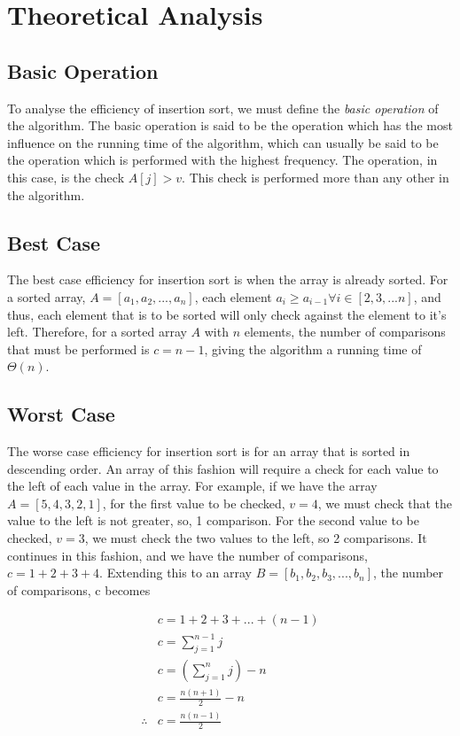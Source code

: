 \documentclass{article}
\begin{document}
\section{Theoretical Analysis}
    \subsection{Basic Operation}
        To analyse the efficiency of insertion sort, we must define the \textit{basic operation} of the algorithm. The basic operation is said to be the operation which has the most influence on the running time of the algorithm, which can usually be said to be the operation which is performed with the highest frequency. The operation, in this case, is the check $A[j] > v$. This check is performed more than any other in the algorithm.
    \subsection{Best Case}
        The best case efficiency for insertion sort is when the array is already sorted. For a sorted array, $A = [a_1, a_2, ..., a_n]$, each element $a_{i} \geq a_{i-1} \forall i \in [2, 3, ... n]$, and thus, each element that is to be sorted will only check against the element to it's left. Therefore, for a sorted array $A$ with $n$ elements, the number of comparisons that must be performed is $c = n - 1$, giving the algorithm a running time of $\Theta(n)$.
    \subsection{Worst Case}
        The worse case efficiency for insertion sort is for an array that is sorted in descending order. An array of this fashion will require a check for each value to the left of each value in the array. For example, if we have the array $A=[5, 4, 3, 2, 1]$, for the first value to be checked, $v = 4$, we must check that the value to the left is not greater, so, 1 comparison. For the second value to be checked, $v = 3$, we must check the two values to the left, so 2 comparisons. It continues in this fashion, and we have the number of comparisons, $c = 1 + 2 + 3 + 4$. Extending this to an array $B=[b_1, b_2, b_3, ..., b_n]$, the number of comparisons, c becomes

        \begin{align}
            & c = 1 + 2 + 3 + ... + (n - 1) \\
            & c = \sum_{j = 1}^{n - 1} j \\
            & c = (\sum_{j = 1}^{n} j) - n\\
            & c = \frac{n(n + 1)}{2} - n \\
            \therefore{} & c = \frac{n(n - 1)}{2}
        \end{align}
\end{document}
